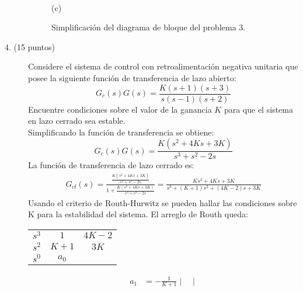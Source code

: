 \documentclass[11pt, spanish]{article}
\begin{document}
\begin{description}
\begin{figure}
\\
				(c)
				\caption{Simplificación del diagrama de bloque del problema 3.}
				\label{fig:blockDiagramSimplification}
			\end{figure}

			\item [4. (15 puntos)] Considere el sistema de control con retroalimentación negativa unitaria que posee la siguiente función de transferencia de lazo abierto:
			\begin{equation*}
				G_c(s)G(s) = \frac{K(s+1)(s+3)}{s(s-1)(s+2)}
			\end{equation*}
			Encuentre condiciones sobre el valor de la ganancia $K$ para que el sistema en lazo cerrado sea estable.\\
			Simplificando la función de transferencia se obtiene:
			\begin{equation*}
				G_c(s)G(s) = \frac{K(s^2+4Ks+3K)}{s^3+s^2-2s}
			\end{equation*}
			La función de transferencia de lazo cerrado es:
			\begin{align*}
				G_{cl}(s) = \frac{\frac{K(s^2+4Ks+3K)}{s^3+s^2-2s}}{1+\frac{K(s^2+4Ks+3K)}{s^3+s^2-2s}} = \frac{Ks^2+4Ks+3K}{s^3+(K+1)s^2+(4K-2)s+3K}
			\end{align*}
			Usando el criterio de Routh-Hurwitz se pueden hallar las condiciones sobre K para la estabilidad del sistema. El arreglo de Routh queda:
			\begin{table}[h]
				\centering
				\begin{tabular}{c|cc}
					$s^3$ & $1$ & $4K-2$\\
					$s^2$ & $K+1$ & $3K$\\
					$s^0$ & $a_0$
				\end{tabular}
			\end{table}
			\begin{align*}
				a_1 &= -\frac{1}{K+1}
				\begin{vmatrix}

\end{vmatrix}
\end{align*}
\end{description}
\end{document}
